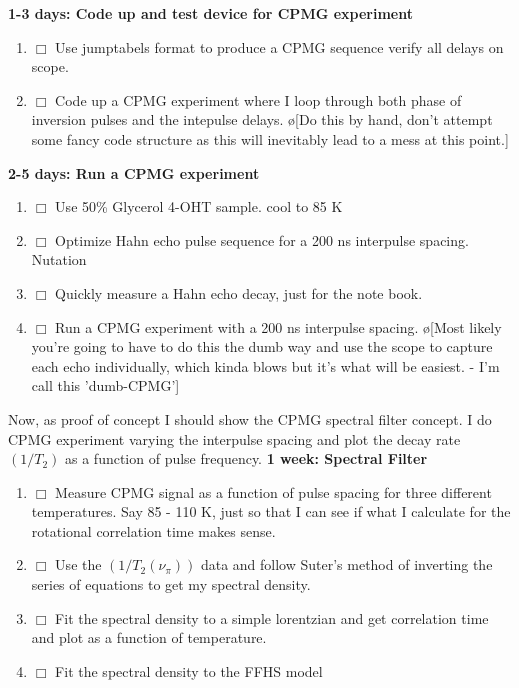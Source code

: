 \documentclass[10pt]{book}
\begin{document}
{\bf 1-3 days: Code up and test device for CPMG experiment}
\begin{enumerate}
    \item $\Box$ Use jumptabels format to produce a CPMG sequence verify all delays on scope.
    \item $\Box$ Code up a CPMG experiment where I loop through both phase of inversion pulses and the intepulse delays. \o[Do this by hand, don't attempt some fancy code structure as this will inevitably lead to a mess at this point.]{}\\
\end{enumerate}


{\bf 2-5 days: Run a CPMG experiment}
\begin{enumerate}
    \item $\Box$ Use 50\% Glycerol 4-OHT sample. cool to 85 K
    \item $\Box$ Optimize Hahn echo pulse sequence for a 200 ns interpulse spacing. Nutation
    \item $\Box$ Quickly measure a Hahn echo decay, just for the note book.
    \item $\Box$ Run a CPMG experiment with a 200 ns interpulse spacing. \o[Most likely you're going to have to do this the dumb way and use the scope to capture each echo individually, which kinda blows but it's what will be easiest. - I'm call this 'dumb-CPMG']{}\\
\end{enumerate}

Now, as proof of concept I should show the CPMG spectral filter concept. I do CPMG experiment varying the interpulse spacing and plot the decay rate $(1/T_2)$ as a function of pulse frequency.
{\bf 1 week: Spectral Filter}
\begin{enumerate}
    \item $\Box$ Measure CPMG signal as a function of pulse spacing for three different temperatures. Say 85 - 110 K, just so that I can see if what I calculate for the rotational correlation time makes sense.
    \item $\Box$ Use the $(1/T_2(\nu_{\pi}))$ data and follow Suter's method of inverting the series of equations to get my spectral density.
    \item $\Box$ Fit the spectral density to a simple lorentzian and get correlation time and plot as a function of temperature.
    \item $\Box$ Fit the spectral density to the FFHS model\\
\end{enumerate}
\end{document}

